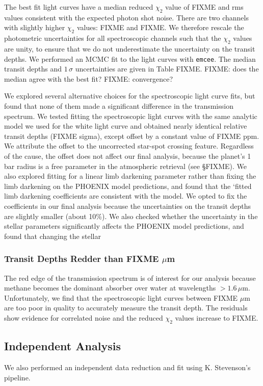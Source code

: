 \documentclass[twocolumn]{aastex61}
\begin{document}
The best fit light curves have a median reduced $\chi_2$ value of FIXME and rms values consistent with the expected photon shot noise.  There are two channels with slightly higher $\chi_2$ values: FIXME and FIXME. We therefore rescale the photometric uncertainties for all spectroscopic channels such that the $\chi_2$ values are unity, to ensure that we do not underestimate the uncertainty on the transit depths. We performed an MCMC fit to the light curves with \texttt{emcee}. The median transit depths and $1\,\sigma$ uncertainties are given in Table FIXME. FIXME: does the  median agree with the best fit? FIXME: convergence?

We explored several alternative choices for the spectroscopic light curve fits, but found that none of them made a significant difference in the transmission spectrum. We tested fitting the spectroscopic light curves with the same analytic model we used for the white light curve and obtained nearly identical relative transit depths (FIXME sigma), except offset by a constant value of FIXME ppm. We attribute the offset to the uncorrected star-spot crossing feature. Regardless of the cause, the offset does not affect our final analysis, because the planet's 1 bar radius is a free parameter in the atmospheric retrieval (see \S FIXME). We also explored fitting for a linear limb darkening parameter rather than fixing the limb darkening on the PHOENIX model predictions, and found that the `fitted limb darkening coefficients are consistent with the model.  We opted to fix the coefficients in our final analysis because the uncertainties on the transit depths are slightly smaller (about 10\%). We also checked whether the uncertainty in the stellar parameters significantly affects the PHOENIX model predictions, and found that changing the stellar 

\subsubsection{Transit Depths Redder than FIXME $\mu$m}
The red edge of the transmission spectrum is of interest for our analysis because methane becomes the dominant absorber over water at wavelengths $> 1.6\,\mu$m. Unfortunately, we find that the spectroscopic light curves between FIXME $\mu$m are too poor in quality to accurately measure the transit depth. The residuals show evidence for correlated noise and the reduced $\chi_2$ values increase to FIXME. 

\subsection{Independent Analysis}
We also performed an independent data reduction and fit using K. Stevenson's pipeline.
\end{document}
